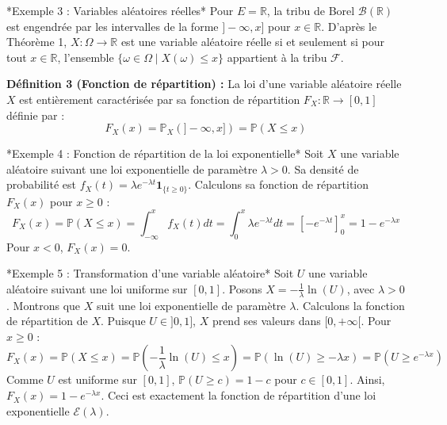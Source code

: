\documentclass[11pt,a4paper]{article}
\begin{document}
*Exemple 3 : Variables aléatoires réelles*
Pour $E = \mathbb{R}$, la tribu de Borel $\mathcal{B}(\mathbb{R})$ est engendrée par les intervalles de la forme $]-\infty, x]$ pour $x \in \mathbb{R}$.
D'après le Théorème 1, $X : \Omega \to \mathbb{R}$ est une variable aléatoire réelle si et seulement si pour tout $x \in \mathbb{R}$, l'ensemble $\{ \omega \in \Omega \mid X(\omega) \leq x \}$ appartient à la tribu $\mathcal{F}$.

\textbf{Définition 3 (Fonction de répartition) :}
La loi d'une variable aléatoire réelle $X$ est entièrement caractérisée par sa fonction de répartition $F_X : \mathbb{R} \to [0, 1]$ définie par :
$$ F_X(x) = \mathbb{P}_X(]-\infty, x]) = \mathbb{P}(X \leq x) $$

*Exemple 4 : Fonction de répartition de la loi exponentielle*
Soit $X$ une variable aléatoire suivant une loi exponentielle de paramètre $\lambda > 0$. Sa densité de probabilité est $f_X(t) = \lambda e^{-\lambda t} \mathbf{1}_{\{t \geq 0\}}$.
Calculons sa fonction de répartition $F_X(x)$ pour $x \geq 0$ :
$$ F_X(x) = \mathbb{P}(X \leq x) = \int_{-\infty}^{x} f_X(t) dt = \int_{0}^{x} \lambda e^{-\lambda t} dt = \left[ -e^{-\lambda t} \right]_0^x = 1 - e^{-\lambda x} $$
Pour $x < 0$, $F_X(x) = 0$.

*Exemple 5 : Transformation d'une variable aléatoire*
Soit $U$ une variable aléatoire suivant une loi uniforme sur $[0, 1]$. Posons $X = -\frac{1}{\lambda} \ln(U)$, avec $\lambda > 0$.
Montrons que $X$ suit une loi exponentielle de paramètre $\lambda$.
Calculons la fonction de répartition de $X$. Puisque $U \in ]0, 1]$, $X$ prend ses valeurs dans $[0, +\infty[$.
Pour $x \geq 0$ :
$$ F_X(x) = \mathbb{P}(X \leq x) = \mathbb{P}\left(-\frac{1}{\lambda} \ln(U) \leq x\right) = \mathbb{P}(\ln(U) \geq -\lambda x) = \mathbb{P}(U \geq e^{-\lambda x}) $$
Comme $U$ est uniforme sur $[0, 1]$, $\mathbb{P}(U \geq c) = 1 - c$ pour $c \in [0, 1]$.
Ainsi, $F_X(x) = 1 - e^{-\lambda x}$. Ceci est exactement la fonction de répartition d'une loi exponentielle $\mathcal{E}(\lambda)$.
\end{document}
